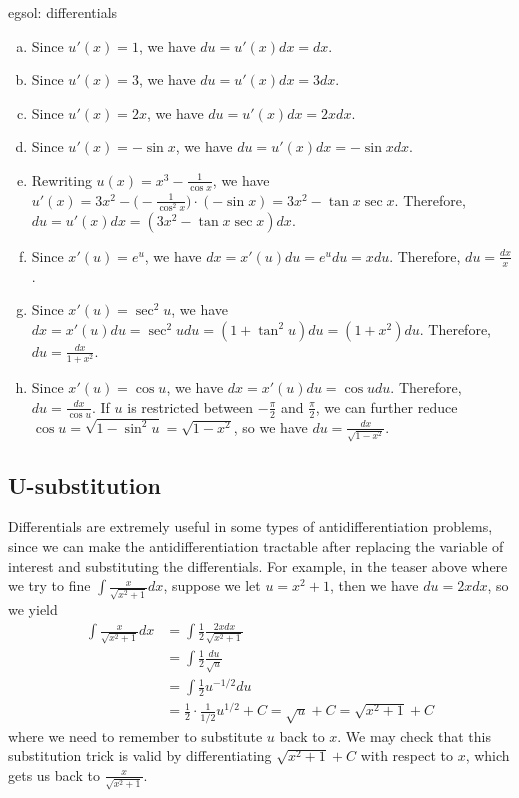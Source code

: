 \begin{egsol}[]{egsol: differentials}
    \begin{enumerate}[a)]
        \item Since $u'(x) = 1$, we have $du = u'(x)dx = dx$.
        \item Since $u'(x) = 3$, we have $du = u'(x)dx = 3dx$.
        \item Since $u'(x) = 2x$, we have $du = u'(x)dx = 2xdx$.
        \item Since $u'(x) = -\sin x$, we have $du = u'(x)dx = -\sin xdx$.
        \item Rewriting $u(x) = x^3 - \frac{1}{\cos x}$, we have $u'(x) = 3x^2 - \big(-\frac{1}{\cos^2 x}\big)\cdot(-\sin x) = 3x^2 - \tan x \sec x$.  Therefore, $du = u'(x)dx = (3x^2 - \tan x \sec x) dx$.
        \item Since $x'(u) = e^u$, we have $dx = x'(u)du = e^u du = x du$.  Therefore, $du = \frac{dx}{x}$.
        \item Since $x'(u) = \sec^2 u$, we have $dx = x'(u)du = \sec^2 u du = (1+\tan^2 u) du = (1+x^2) du$.  Therefore, $du = \frac{dx}{1+x^2}$.
        \item Since $x'(u) = \cos u$, we have $dx = x'(u)du = \cos u du$.  Therefore, $du = \frac{dx}{\cos u}$.  If $u$ is restricted between $-\frac{\pi}{2}$ and $\frac{\pi}{2}$, we can further reduce $\cos u = \sqrt{1-\sin^2 u} = \sqrt{1-x^2}$, so we have $du = \frac{dx}{\sqrt{1-x^2}}$.
    \end{enumerate}
\end{egsol}

\subsection{U-substitution}

Differentials are extremely useful in some types of antidifferentiation problems, since we can make the antidifferentiation tractable after replacing the variable of interest and substituting the differentials.  For example, in the teaser above where we try to fine $\int \frac{x}{\sqrt{x^2+1}} dx$, suppose we let $u = x^2 + 1$, then we have $du = 2xdx$, so we yield
\begin{align*}
    \int \frac{x}{\sqrt{x^2+1}} dx &= \int \frac{1}{2}\frac{2xdx}{\sqrt{x^2+1}}\\
    &= \int \frac{1}{2}\frac{du}{\sqrt{u}}\\
    &= \int \frac{1}{2} u^{-1/2} du\\
    &= \frac{1}{2} \cdot \frac{1}{1/2}u^{1/2} + C = \sqrt{u} + C = \sqrt{x^2+1} + C
\end{align*}
where we need to remember to substitute $u$ back to $x$.  We may check that this substitution trick is valid by differentiating $\sqrt{x^2+1} + C$ with respect to $x$, which gets us back to $\frac{x}{\sqrt{x^2+1}}$. 

